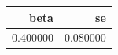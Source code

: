 \begin{tabular}{rr}
\toprule
beta & se \\
\midrule
0.400000 & 0.080000 \\
\bottomrule
\end{tabular}

